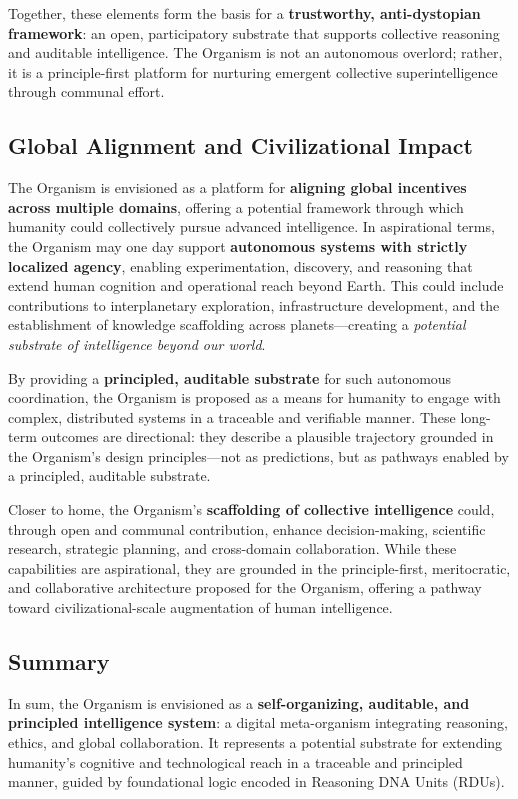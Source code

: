 \documentclass[12pt]{article}
\begin{document}
Together, these elements form the basis for a \textbf{trustworthy, anti-dystopian framework}: an open, participatory substrate that supports collective reasoning and auditable intelligence. The Organism is not an autonomous overlord; rather, it is a principle-first platform for nurturing emergent collective superintelligence through communal effort.

\subsection{Global Alignment and Civilizational Impact}

The Organism is envisioned as a platform for \textbf{aligning global incentives across multiple domains}, offering a potential framework through which humanity could collectively pursue advanced intelligence. In aspirational terms, the Organism may one day support \textbf{autonomous systems with strictly localized agency}, enabling experimentation, discovery, and reasoning that extend human cognition and operational reach beyond Earth. This could include contributions to interplanetary exploration, infrastructure development, and the establishment of knowledge scaffolding across planets—creating a \textit{potential substrate of intelligence beyond our world}.  

By providing a \textbf{principled, auditable substrate} for such autonomous coordination, the Organism is proposed as a means for humanity to engage with complex, distributed systems in a traceable and verifiable manner. These long-term outcomes are directional: they describe a plausible trajectory grounded in the Organism’s design principles—not as predictions, but as pathways enabled by a principled, auditable substrate.

Closer to home, the Organism’s \textbf{scaffolding of collective intelligence} could, through open and communal contribution, enhance decision-making, scientific research, strategic planning, and cross-domain collaboration. While these capabilities are aspirational, they are grounded in the principle-first, meritocratic, and collaborative architecture proposed for the Organism, offering a pathway toward civilizational-scale augmentation of human intelligence.

\subsection{Summary}

In sum, the Organism is envisioned as a \textbf{self-organizing, auditable, and principled intelligence system}: a digital meta-organism integrating reasoning, ethics, and global collaboration. It represents a potential substrate for extending humanity’s cognitive and technological reach in a traceable and principled manner, guided by foundational logic encoded in Reasoning DNA Units (RDUs).
\end{document}
